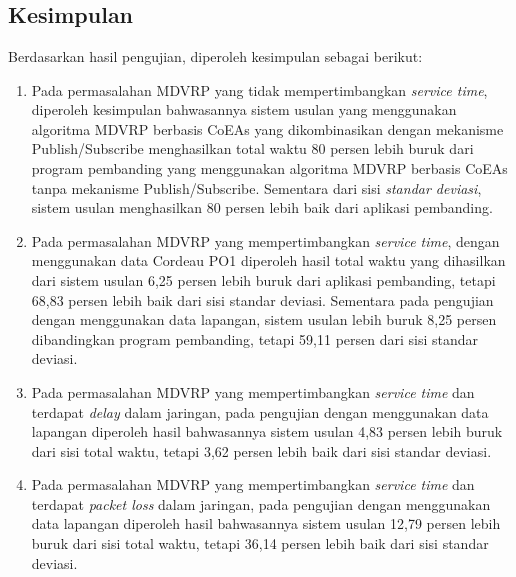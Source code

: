 \chapter{\kesimpulan}


\section{Kesimpulan}
Berdasarkan hasil pengujian, diperoleh kesimpulan sebagai berikut:

\begin{enumerate}
	\item Pada permasalahan MDVRP yang tidak mempertimbangkan \textit{service time}, diperoleh kesimpulan bahwasannya sistem usulan yang menggunakan algoritma MDVRP berbasis CoEAs yang dikombinasikan dengan mekanisme Publish/Subscribe menghasilkan total waktu 80 persen lebih buruk dari program pembanding yang menggunakan algoritma MDVRP berbasis CoEAs tanpa mekanisme Publish/Subscribe. Sementara dari sisi \textit{standar deviasi}, sistem usulan menghasilkan 80 persen lebih baik dari aplikasi pembanding.
	\item Pada permasalahan MDVRP yang mempertimbangkan \textit{service time}, dengan menggunakan data Cordeau PO1 diperoleh hasil total waktu yang dihasilkan dari sistem usulan 6,25 persen lebih buruk dari aplikasi pembanding, tetapi 68,83 persen lebih baik dari sisi standar deviasi. Sementara pada pengujian dengan menggunakan data lapangan, sistem usulan lebih buruk 8,25 persen dibandingkan program pembanding, tetapi 59,11 persen dari sisi standar deviasi.
	\item Pada permasalahan MDVRP yang mempertimbangkan \textit{service time} dan terdapat \textit{delay} dalam jaringan, pada pengujian dengan menggunakan data lapangan diperoleh hasil bahwasannya sistem usulan 4,83 persen lebih buruk dari sisi total waktu, tetapi 3,62 persen lebih baik dari sisi standar deviasi.
	\item Pada permasalahan MDVRP yang mempertimbangkan \textit{service time} dan terdapat \textit{packet loss} dalam jaringan, pada pengujian dengan menggunakan data lapangan diperoleh hasil bahwasannya sistem usulan 12,79 persen lebih buruk dari sisi total waktu, tetapi 36,14 persen lebih baik dari sisi standar deviasi.
\end{enumerate}


